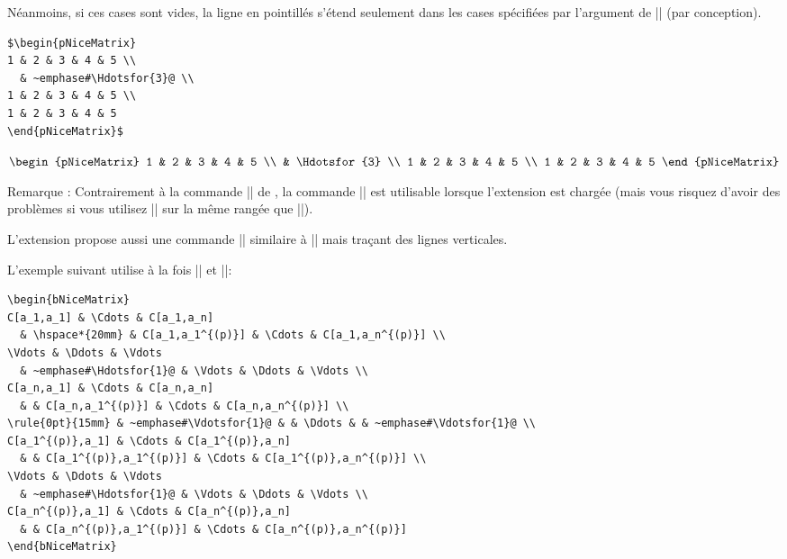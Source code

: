 \documentclass[dvipsnames]{article}%
\begin{document}
\bigskip
Néanmoins, si ces cases sont vides, la ligne en pointillés s'étend seulement
dans les cases spécifiées par l'argument de |\Hdotsfor| (par conception).

\medskip
\begin{BVerbatim}[baseline=c,boxwidth=7cm]
$\begin{pNiceMatrix}
1 & 2 & 3 & 4 & 5 \\
  & ~emphase#\Hdotsfor{3}@ \\
1 & 2 & 3 & 4 & 5 \\
1 & 2 & 3 & 4 & 5 
\end{pNiceMatrix}$
\end{BVerbatim}
$\begin{pNiceMatrix}
1 & 2 & 3 & 4 & 5 \\
  & \Hdotsfor{3} \\
1 & 2 & 3 & 4 & 5 \\
1 & 2 & 3 & 4 & 5 
\end{pNiceMatrix}$

\medskip
Remarque : Contrairement à la commande |\hdotsfor| de , la commande
|\Hdotsfor| est utilisable lorsque l'extension  est chargée (mais
vous risquez d'avoir des problèmes si vous utilisez |\rowcolor| sur la même
rangée que |\Hdotsfor|).

\bigskip
L'extension  propose aussi une commande |\Vdotsfor| similaire à
|\Hdotsfor| mais traçant des lignes verticales.

\bigskip
L'exemple suivant utilise à la fois |\Hdotsfor| et |\Vdotsfor|:

\begin{Verbatim}[formatcom=\small\color{gray}]
\begin{bNiceMatrix}
C[a_1,a_1] & \Cdots & C[a_1,a_n] 
  & \hspace*{20mm} & C[a_1,a_1^{(p)}] & \Cdots & C[a_1,a_n^{(p)}] \\
\Vdots & \Ddots & \Vdots 
  & ~emphase#\Hdotsfor{1}@ & \Vdots & \Ddots & \Vdots \\ 
C[a_n,a_1] & \Cdots & C[a_n,a_n] 
  & & C[a_n,a_1^{(p)}] & \Cdots & C[a_n,a_n^{(p)}] \\
\rule{0pt}{15mm} & ~emphase#\Vdotsfor{1}@ & & \Ddots & & ~emphase#\Vdotsfor{1}@ \\
C[a_1^{(p)},a_1] & \Cdots & C[a_1^{(p)},a_n] 
  & & C[a_1^{(p)},a_1^{(p)}] & \Cdots & C[a_1^{(p)},a_n^{(p)}] \\
\Vdots & \Ddots & \Vdots 
  & ~emphase#\Hdotsfor{1}@ & \Vdots & \Ddots & \Vdots \\ 
C[a_n^{(p)},a_1] & \Cdots & C[a_n^{(p)},a_n] 
  & & C[a_n^{(p)},a_1^{(p)}] & \Cdots & C[a_n^{(p)},a_n^{(p)}]
\end{bNiceMatrix}
\end{Verbatim}
\end{document}
